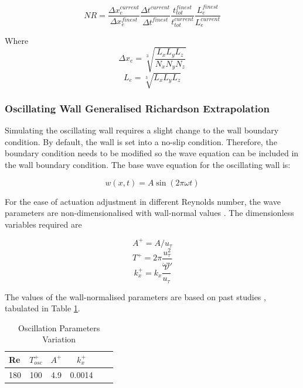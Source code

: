 \begin{equation}
	NR = \frac{\Delta x_e^{current}}{\Delta x_e^{finest}} \frac{\Delta t^{current}}{\Delta t^{finest}} \frac{t_{tot}^{finest}}{t_{tot}^{current}} \frac{L_e^{finest}}{L_e^{current}}
\end{equation}

Where
\begin{equation}
	\Delta x_e = \sqrt[3]{\frac{L_x L_y L_z}{N_x N_y N_z}}
\end{equation}
\begin{equation}
	L_e = \sqrt[3]{L_x L_y L_z}
\end{equation}


\subsubsection{Oscillating Wall Generalised Richardson Extrapolation}
\label{sec:OscWall}
Simulating the oscillating wall requires a slight change to the wall boundary condition. By default, the wall is set into a no-slip condition. Therefore, the boundary condition needs to be modified so the wave equation can be included in the wall boundary condition. The base wave equation for the oscillating wall is:

\begin{equation}
	w(x, t) = A \sin(2\pi \omega t)
\end{equation}

For the ease of actuation adjustment in different Reynolds number, the wave parameters are non-dimensionalised with wall-normal values \cite{Ricco2021}. The dimensionless variables required are

\begin{equation}
	A^+ = A/u_\tau
\end{equation}
\begin{equation}
	T^+ = 2\pi \frac{u_\tau^2}{\omega\nu}
\end{equation}
\begin{equation}
	k_x^+ = k_x \frac{\nu}{u_\tau}
\end{equation}

The values of the wall-normalised parameters are based on past studies \cite{Marusic2021} \cite{Zhou2008TurbulentDR}, tabulated in Table \ref{tab:GCSset}.

\begin{table}[h!]
	\centering
	\caption{Oscillation Parameters Variation}
	\label{tab:GCSset}
	\begin{tabular}{lccccc}
		\hline
		\textbf{Re}& \textbf{$T^+_{osc}$} & \textbf{$A^+$} & \textbf{$k_x^+$}  \\ \hline
		180 & 100 & 4.9 & 0.0014 \\ \hline
	\end{tabular}
\end{table}

